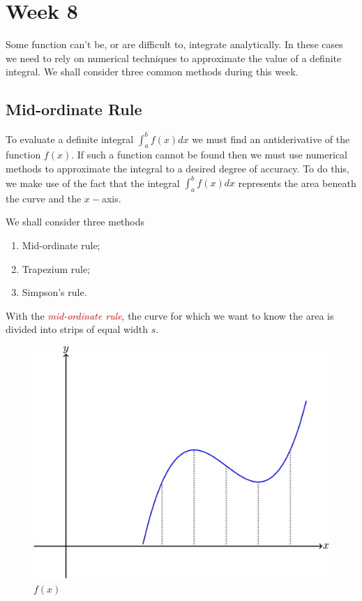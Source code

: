\documentclass[
  11pt,
  oneside]{book}
\providecommand{\tightlist}{%
  \setlength{\itemsep}{0pt}\setlength{\parskip}{0pt}}
\newcommand{\slide}{}
\theoremstyle{definition}
\theoremstyle{definition}
\theoremstyle{definition}
\theoremstyle{definition}
\theoremstyle{remark}
\begin{document}
\chapter{Week 8}\label{week-eight}

Some function can't be, or are difficult to, integrate analytically. In these cases we need to rely on numerical techniques to approximate the value of a definite integral. We shall consider three common methods during this week.

\slide

\section{Mid-ordinate Rule}\label{mid-ordinate-rule}

To evaluate a definite integral \(\displaystyle\int_a^bf(x)dx\) we must find an antiderivative of the function \(f(x)\). If such a function cannot be found then we must use numerical methods to approximate the integral to a desired degree of accuracy. To do this, we make use of the fact that the integral \(\displaystyle\int_a^bf(x)dx\) represents the area beneath the curve and the \(x-\)axis.

We shall consider three methods

\begin{enumerate}
\def\labelenumi{\arabic{enumi}.}
\tightlist
\item
  Mid-ordinate rule;
\item
  Trapezium rule;
\item
  Simpson's rule.
\end{enumerate}

\slide

With the \textcolor{red}{\em mid-ordinate rule}, the curve for which we want to know the area is divided into strips of equal width \(s\).

\begin{figure}

{\centering \includegraphics[width=0.4\linewidth]{tikztopng-figure26} 

}

\caption{$f(x)$}\label{fig:unnamed-chunk-51}
\end{figure}
\end{document}
